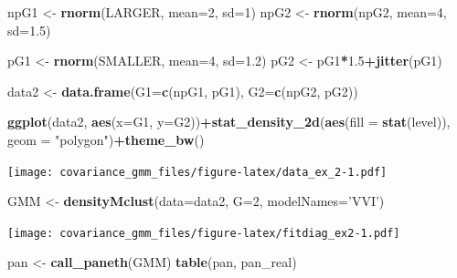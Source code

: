 \documentclass[]{article}
\newenvironment{Shaded}{\begin{snugshade}}{\end{snugshade}}
\newcommand{\DataTypeTok}[1]{\textcolor[rgb]{0.13,0.29,0.53}{#1}}
\newcommand{\DecValTok}[1]{\textcolor[rgb]{0.00,0.00,0.81}{#1}}
\newcommand{\FloatTok}[1]{\textcolor[rgb]{0.00,0.00,0.81}{#1}}
\newcommand{\KeywordTok}[1]{\textcolor[rgb]{0.13,0.29,0.53}{\textbf{#1}}}
\newcommand{\NormalTok}[1]{#1}
\newcommand{\OperatorTok}[1]{\textcolor[rgb]{0.81,0.36,0.00}{\textbf{#1}}}
\newcommand{\StringTok}[1]{\textcolor[rgb]{0.31,0.60,0.02}{#1}}
\begin{document}
\begin{Shaded}
\begin{Highlighting}[]
\NormalTok{npG1 <-}\StringTok{ }\KeywordTok{rnorm}\NormalTok{(LARGER, }\DataTypeTok{mean=}\DecValTok{2}\NormalTok{, }\DataTypeTok{sd=}\DecValTok{1}\NormalTok{)}
\NormalTok{npG2 <-}\StringTok{ }\KeywordTok{rnorm}\NormalTok{(npG2, }\DataTypeTok{mean=}\DecValTok{4}\NormalTok{, }\DataTypeTok{sd=}\FloatTok{1.5}\NormalTok{)}

\NormalTok{pG1 <-}\StringTok{ }\KeywordTok{rnorm}\NormalTok{(SMALLER, }\DataTypeTok{mean=}\DecValTok{4}\NormalTok{, }\DataTypeTok{sd=}\FloatTok{1.2}\NormalTok{)}
\NormalTok{pG2 <-}\StringTok{ }\NormalTok{pG1}\OperatorTok{*}\FloatTok{1.5}\OperatorTok{+}\KeywordTok{jitter}\NormalTok{(pG1)}

\NormalTok{data2 <-}\StringTok{ }\KeywordTok{data.frame}\NormalTok{(}\DataTypeTok{G1=}\KeywordTok{c}\NormalTok{(npG1, pG1), }\DataTypeTok{G2=}\KeywordTok{c}\NormalTok{(npG2, pG2))}

\KeywordTok{ggplot}\NormalTok{(data2, }\KeywordTok{aes}\NormalTok{(}\DataTypeTok{x=}\NormalTok{G1, }\DataTypeTok{y=}\NormalTok{G2))}\OperatorTok{+}\KeywordTok{stat_density_2d}\NormalTok{(}\KeywordTok{aes}\NormalTok{(}\DataTypeTok{fill =} \KeywordTok{stat}\NormalTok{(level)), }\DataTypeTok{geom =} \StringTok{"polygon"}\NormalTok{)}\OperatorTok{+}\KeywordTok{theme_bw}\NormalTok{()}
\end{Highlighting}
\end{Shaded}

\texttt{[image: covariance\_gmm\_files/figure-latex/data\_ex\_2-1.pdf]}

\begin{Shaded}
\begin{Highlighting}[]
\NormalTok{GMM <-}\StringTok{ }\KeywordTok{densityMclust}\NormalTok{(}\DataTypeTok{data=}\NormalTok{data2, }\DataTypeTok{G=}\DecValTok{2}\NormalTok{, }\DataTypeTok{modelNames=}\StringTok{'VVI'}\NormalTok{)}
\end{Highlighting}
\end{Shaded}

\texttt{[image: covariance\_gmm\_files/figure-latex/fitdiag\_ex2-1.pdf]}

\begin{Shaded}
\begin{Highlighting}[]
\NormalTok{pan <-}\StringTok{ }\KeywordTok{call_paneth}\NormalTok{(GMM)}
\KeywordTok{table}\NormalTok{(pan, pan_real)}
\end{Highlighting}
\end{Shaded}
\end{document}
